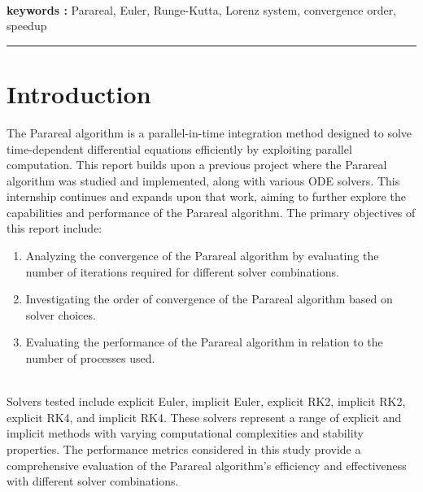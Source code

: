 \documentclass[a4paper,12pt,french]{article}
\begin{document}
\\

{\noindent\textbf{keywords :}}
Parareal, Euler, Runge-Kutta, Lorenz system, convergence order, speedup
\\
\noindent\rule[2pt]{\textwidth}{0.5pt}

\vspace*{\fill}
\newpage


\thispagestyle{empty}
\tableofcontents
\newpage
\listoffigures
\newpage
\section{Introduction}
The Parareal algorithm is a parallel-in-time integration method designed to solve time-dependent differential equations efficiently by exploiting parallel computation. This report builds upon a previous project where the Parareal algorithm was studied and implemented, along with various ODE solvers. This internship continues and expands upon that work, aiming to further explore the capabilities and performance of the Parareal algorithm.
\newline
\newline
The primary objectives of this report include:
\begin{enumerate}
    \item Analyzing the convergence of the Parareal algorithm by evaluating the number of iterations required for different solver combinations.
    \item Investigating the order of convergence of the Parareal algorithm based on solver choices.
    \item Evaluating the performance of the Parareal algorithm in relation to the number of processes used.
\end{enumerate}\\

Solvers tested include explicit Euler, implicit Euler, explicit RK2, implicit RK2, explicit RK4, and implicit RK4. These solvers represent a range of explicit and implicit methods with varying computational complexities and stability properties. The performance metrics considered in this study provide a comprehensive evaluation of the Parareal algorithm’s efficiency and effectiveness with different solver combinations.
\end{document}
